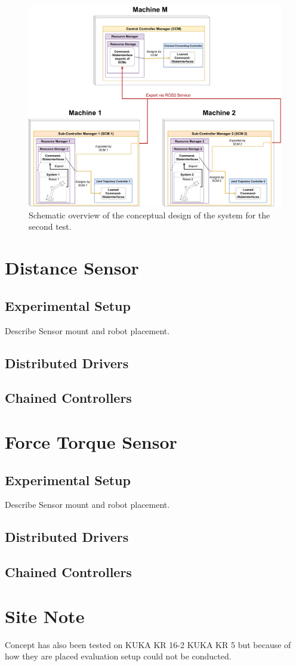 \begin{figure}[htbp]
	\centering
	\includegraphics[width=1\textwidth]{Figures/c6/test_scenario_2.drawio.pdf}
	\caption{Schematic overview of the conceptual design of the system for the second test.}
	\label{c6_fig_test_scenario_2}
\end{figure}
\section{Distance Sensor}
\subsection{Experimental Setup}
Describe Sensor mount and robot placement.
\subsection{Distributed Drivers}
\subsection{Chained Controllers}
\section{Force Torque Sensor}
\subsection{Experimental Setup}
Describe Sensor mount and robot placement.
\subsection{Distributed Drivers}
\subsection{Chained Controllers}
\section*{Site Note}
Concept has also been tested on KUKA KR 16-2 KUKA KR 5 but because of how they are placed evaluation setup could not be conducted.

